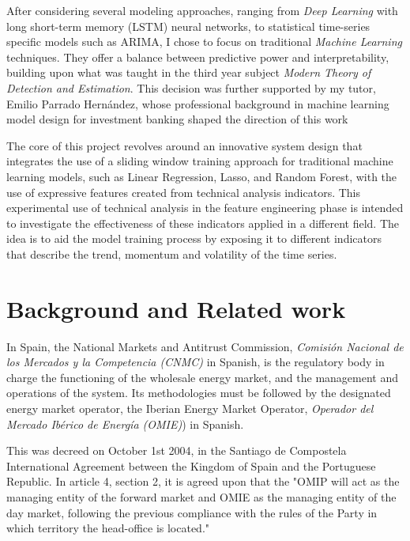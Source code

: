 \documentclass[12pt]{report} %
\begin{document}
After considering several modeling approaches, ranging from \textit{Deep Learning} with long short-term memory (LSTM) neural networks, to statistical time-series specific models such as ARIMA, I chose to focus on traditional \textit{Machine Learning} techniques. They offer a balance between predictive power and interpretability, building upon what was taught in the third year subject \textit{Modern Theory of Detection and Estimation}. This decision was further supported by my tutor, Emilio Parrado Hernández, whose professional background in machine learning model design for investment banking shaped the direction of this work

The core of this project revolves around an innovative system design that integrates the use of a sliding window training approach for traditional machine learning models, such as Linear Regression, Lasso, and Random Forest, with the use of expressive features created from technical analysis indicators. This experimental use of technical analysis in the feature engineering phase is intended to investigate the effectiveness of these indicators applied in a different field. The idea is to aid the model training process by exposing it to different indicators that describe the trend, momentum and volatility of the time series.



\chapter{Background and Related work}
In Spain, the National Markets and Antitrust Commission, \textit{Comisión Nacional de los Mercados y la Competencia (CNMC)} in Spanish, is the regulatory body in charge the functioning of the wholesale energy market, and the management and operations of the system. \cite{boe_cnmc_BOE-A-2019-17287} Its methodologies must be followed by the designated energy market operator, the Iberian Energy Market Operator, \textit{Operador del Mercado Ibérico de Energía (OMIE)}) in Spanish.

This was decreed on October 1st 2004, in the Santiago de Compostela International Agreement between the Kingdom of Spain and the Portuguese Republic. In article 4, section 2, it is agreed upon that the "OMIP will act as the managing entity of the forward market and OMIE as the managing entity of the day market, following the previous compliance with the rules of the Party in which territory the head-office is located." \cite{SantiagoAgreement2004}
\end{document}
